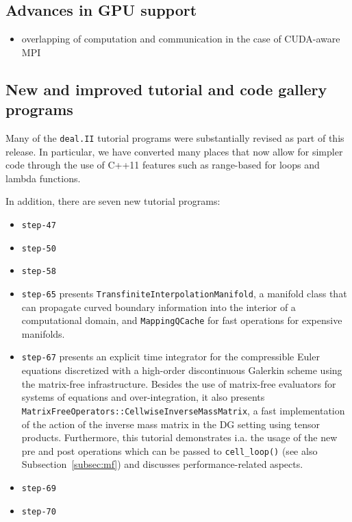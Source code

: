 \documentclass{ansarticle-preprint}
\newcommand{\specialword}[1]{\texttt{#1}}
\newcommand{\dealii}{{\specialword{deal.II}}\xspace}
\begin{document}
\subsection{Advances in GPU support}
\label{subsec:gpu}

\begin{itemize}
\item overlapping of computation and communication in the case of CUDA-aware MPI
\end{itemize}


\subsection{New and improved tutorial and code gallery programs}
\label{subsec:steps}

Many of the \dealii{} tutorial programs were substantially revised as
part of this release. In particular, we have converted many places
that now allow for simpler code through the use of C++11 features such
as range-based for loops and lambda functions.

In addition, there are seven new tutorial programs:
\begin{itemize}
\item \texttt{step-47}
\item \texttt{step-50}
\item \texttt{step-58}
\item \texttt{step-65} presents \texttt{TransfiniteInterpolationManifold}, a
manifold class that can propagate curved boundary information into the
interior of a computational domain, and \texttt{MappingQCache} for fast operations for
expensive manifolds.
\item \texttt{step-67} presents an explicit time integrator for the
compressible Euler equations discretized with a high-order discontinuous
Galerkin scheme using the matrix-free infrastructure. Besides the use of
matrix-free evaluators for systems of equations and over-integration, it also
presents \texttt{MatrixFreeOperators::CellwiseInverseMassMatrix}, a fast implementation
of the action of the inverse mass matrix in the DG setting using tensor
products. Furthermore, this tutorial demonstrates i.a. the usage of the new 
pre and post operations which can be passed to \texttt{cell\_loop()} 
(see also Subsection~\ref{subsec:mf}) and discusses performance-related aspects.
\item \texttt{step-69}
\item \texttt{step-70}
\end{itemize}
\end{document}
